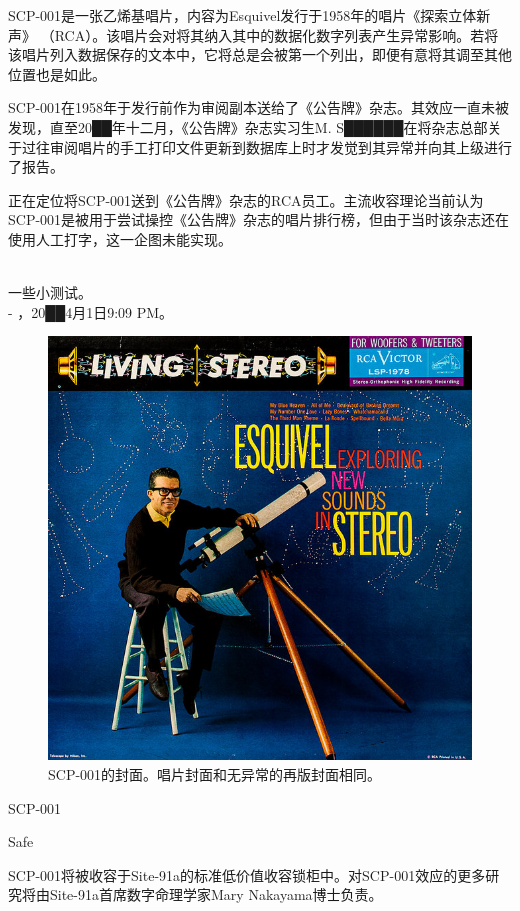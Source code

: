 SCP-001是一张乙烯基唱片，内容为Esquivel发行于1958年的唱片《探索立体新声》 （RCA）。该唱片会对将其纳入其中的数据化数字列表产生异常影响。若将该唱片列入数据保存的文本中，它将总是会被第一个列出，即便有意将其调至其他位置也是如此。

SCP-001在1958年于发行前作为审阅副本送给了《公告牌》杂志。其效应一直未被发现，直至20██年十二月，《公告牌》杂志实习生M. S██████在将杂志总部关于过往审阅唱片的手工打印文件更新到数据库上时才发觉到其异常并向其上级进行了报告。

正在定位将SCP-001送到《公告牌》杂志的RCA员工。主流收容理论当前认为SCP-001是被用于尝试操控《公告牌》杂志的唱片排行榜，但由于当时该杂志还在使用人工打字，这一企图未能实现。


\newpage



\begin{scpbox}
 \\
一些小测试。 \\
- ，20██4月1日9:09 PM。
\end{scpbox}

\begin{figure}[H]
	\centering
	\includegraphics[width=0.5\linewidth]{images/SCP.001.a.record.2.jpg}
	\caption*{SCP-001的封面。唱片封面和无异常的再版封面相同。}
\end{figure}

SCP-001

Safe

SCP-001将被收容于Site-91a的标准低价值收容锁柜中。对SCP-001效应的更多研究将由Site-91a首席数字命理学家Mary Nakayama博士负责。

